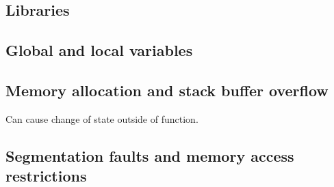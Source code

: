 
\subsection{Libraries}

\subsection{Global and local variables}

\subsection{Memory allocation and stack buffer overflow}

Can cause change of state outside of function.

\subsection{Segmentation faults and memory access restrictions}

